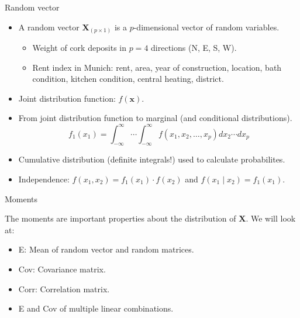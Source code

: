 \documentclass[ignorenonframetext,]{beamer}
\providecommand{\tightlist}{%
  \setlength{\itemsep}{0pt}\setlength{\parskip}{0pt}}
\begin{document}
\begin{frame}{Random vector}

\begin{itemize}
\tightlist
\item
  A random vector \(\mathbf{X}_{(p\times 1)}\) is a \(p\)-dimensional
  vector of random variables.

  \begin{itemize}
  \tightlist
  \item
    Weight of cork deposits in \(p=4\) directions (N, E, S, W).
  \item
    Rent index in Munich: rent, area, year of construction, location,
    bath condition, kitchen condition, central heating, district.
  \end{itemize}
\item
  Joint distribution function: \(f(\mathbf{x})\).
\item
  From joint distribution function to marginal (and conditional
  distributions).
  \[f_1(x_1)=\int_{-\infty}^{\infty}\cdots \int_{-\infty}^{\infty} f(x_1,x_2,\ldots,x_p)dx_2 \cdots dx_p\]
\item
  Cumulative distribution (definite integrals!) used to calculate
  probabilites.
\item
  Independence: \(f(x_1,x_2)=f_1(x_1)\cdot f(x_2)\) and
  \(f(x_1\mid x_2)=f_1(x_1).\)
\end{itemize}

\end{frame}

\begin{frame}

\begin{block}{Moments}

The moments are important properties about the distribution of
\(\mathbf{X}\). We will look at:

\begin{itemize}
\tightlist
\item
  E: Mean of random vector and random matrices.
\item
  Cov: Covariance matrix.
\item
  Corr: Correlation matrix.
\item
  E and Cov of multiple linear combinations.
\end{itemize}

\end{block}

\end{frame}
\end{document}
